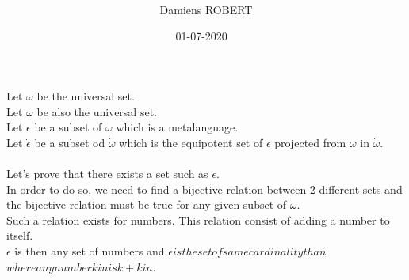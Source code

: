 \documentclass{article}
\title{
}
\date{01-07-2020
~\\
}
\author{
~\\
Damiens ROBERT
}
\begin{document}
  \maketitle
  \section{}
  Let $\omega$ be the universal set.
  ~\\
  Let $\dot{\omega}$ be also the universal set.
  ~\\
  Let $\epsilon$ be a subset of $\omega$ which is a metalanguage.
  ~\\
  Let $\dot{\epsilon}$ be a subset od $\dot{\omega}$ which is the equipotent set of $\epsilon$ projected from $\omega$ in $\dot{\omega}$.
  ~\\
  ~\\
  Let's prove that there exists a set such as $\epsilon$.
  ~\\
  In order to do so, we need to find a bijective relation between 2 different sets and the bijective relation must be true for any given subset of $\omega$.
  ~\\
  Such a relation exists for numbers. This relation consist of adding a number to itself.
  ~\\
  $\epsilon$ is then any set of numbers and $\dot{\epsilon} is the set of same cardinality than $\espilon$ where any number k in $\epsion$ is k+k in $\dot{\epsion}.
\end{document}
